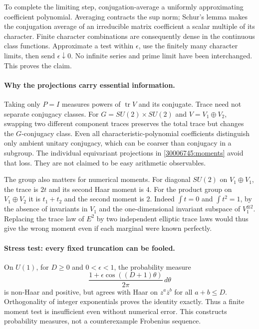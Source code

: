 \documentclass[11pt,a4paper]{article}
\numberwithin{equation}{section}
\begin{document}
To complete the limiting step, conjugation-average a uniformly approximating
coefficient polynomial. Averaging contracts the sup norm; Schur's lemma
makes the conjugation average of an irreducible matrix coefficient a scalar
multiple of its character. Finite character combinations are consequently
dense in the continuous class functions. Approximate a test within
$\epsilon$, use the finitely many character limits, then send
$\epsilon\downarrow0$. No infinite series and prime limit have been
interchanged. This proves the claim.

\paragraph{Why the projections carry essential information.}
Taking only $P=I$ measures powers of $\operatorname{tr}V$ and its conjugate.
Trace need not separate conjugacy classes. For
$G=SU(2)\times SU(2)$ and $V=V_1\oplus V_2$, swapping two different component
traces preserves the total trace but changes the $G$-conjugacy class.
Even all characteristic-polynomial coefficients distinguish only ambient
unitary conjugacy, which can be coarser than conjugacy in a subgroup.
The individual equivariant projections in \eqref{30006745:moments} avoid that
loss. They are not claimed to be easy arithmetic observables.

The group also matters for numerical moments. For diagonal $SU(2)$ on
$V_1\oplus V_1$, the trace is $2t$ and its second Haar moment is $4$.
For the product group on $V_1\oplus V_2$ it is $t_1+t_2$ and the second
moment is $2$. Indeed $\int t=0$ and $\int t^2=1$, by the absence of
invariants in $V_1$ and the one-dimensional invariant subspace of
$V_1^{\otimes2}$. Replacing the trace law of $E^2$ by two independent
elliptic trace laws would thus give the wrong moment even if each marginal
were known perfectly.

\paragraph{Stress test: every fixed truncation can be fooled.}
On $U(1)$, for $D\ge0$ and $0<\epsilon<1$, the probability measure
\[
 \frac{1+\epsilon\cos((D+1)\theta)}{2\pi}\,d\theta
\]
is non-Haar and positive, but agrees with Haar on
$z^a\overline z^b$ for all $a+b\le D$. Orthogonality of integer
exponentials proves the identity exactly. Thus a finite moment test is
insufficient even without numerical error. This constructs probability
measures, not a counterexample Frobenius sequence.
\end{document}
